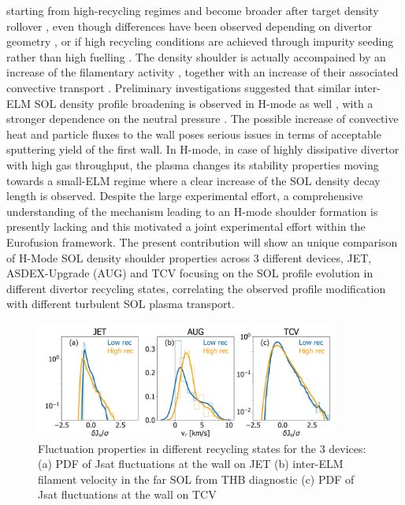 \documentclass[12pt, a4paper, twoside]{article}
\begin{document}
starting from high-recycling regimes and become broader after target
density rollover \cite{vianello:nf2019}, even
though differences have been observed depending on divertor geometry
\cite{Wynn:2018gp}, or if high recycling conditions are achieved
through impurity seeding rather than high fuelling
\cite{Wynn:2018gp,Kuang:2019248}.
The density shoulder is actually accompained by
an increase of the filamentary activity
\cite{Carralero:2017gb,vianello:nf2019,Kuang:2019248}, together with an increase of
their associated convective transport \cite{Carralero:2017gb}.
Preliminary investigations suggested that similar inter-ELM SOL
density profile broadening is observed in H-mode as well
\cite{Muller:2015jt,Carralero:2017gb,vianello:nf2019}, with a stronger
dependence on the neutral pressure \cite{vianello:nf2019}. The
possible increase of convective heat and particle fluxes to the wall
poses serious issues in terms of acceptable sputtering yield of the
first wall. In H-mode,
in case of highly dissipative divertor with high gas throughput, the
plasma changes its stability properties moving towards a small-ELM
regime \cite{Harrer:2018jn} where a clear increase of
the SOL density decay length is observed.
Despite the
large experimental effort, a comprehensive understanding
of the mechanism leading to an H-mode shoulder formation is presently
lacking and this motivated a joint experimental effort within the
Eurofusion framework.
The present contribution will show an unique comparison of H-Mode SOL
density shoulder properties across 3 different devices, JET, ASDEX-Upgrade (AUG) and
TCV focusing on the SOL profile evolution in different divertor recycling
states, correlating the observed profile modification with different turbulent SOL
plasma transport.
\begin{figure}
\includegraphics[width=100mm]{../pdfbox/SynopsisFluctuationCombined.pdf}
\caption{Fluctuation properties in different recycling states for the
  3 devices:(a) PDF of Jsat fluctuations at the wall on JET (b)
  inter-ELM filament velocity in the far SOL from THB diagnostic (c) PDF of Jsat fluctuations at the wall on TCV}
\vspace{-2.6ex}
\label{fig:figFluctuations}
\end{figure}
\end{document}
